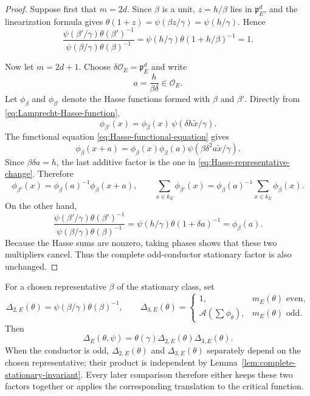 \documentclass[11pt]{amsart}
\theoremstyle{definition}
\theoremstyle{remark}
\newcommand{\cO}{\mathcal O}
\newcommand{\p}{\mathfrak p}
\newcommand{\Aphase}{\mathcal A}
\begin{document}
\begin{proof}
Suppose first that $m=2d$.  Since $\beta$ is a unit,
$z=h/\beta$ lies in $\p_E^d$, and the linearization formula gives
$\theta(1+z)=\psi(\beta z/\gamma)=\psi(h/\gamma)$.  Hence
\[
 \frac{\psi(\beta'/\gamma)\theta(\beta')^{-1}}
      {\psi(\beta/\gamma)\theta(\beta)^{-1}}
 =\psi(h/\gamma)\theta(1+h/\beta)^{-1}=1.
\]

Now let $m=2d+1$.  Choose $\delta\cO_E=\p_E^d$ and write
\[
 a=\frac{h}{\beta\delta}\in\cO_E.
\]
Let $\phi_\beta$ and $\phi_{\beta'}$ denote the Hasse functions formed
with $\beta$ and $\beta'$.  Directly from
\eqref{eq:Lamprecht-Hasse-function},
\begin{equation}\label{eq:Hasse-representative-change}
 \phi_{\beta'}(x)
 =\phi_\beta(x)\,\psi(\delta h\widetilde x/\gamma).
\end{equation}
The functional equation \eqref{eq:Hasse-functional-equation} gives
\[
 \phi_\beta(x+a)
 =\phi_\beta(x)\phi_\beta(a)
   \psi(\beta\delta^2a\widetilde x/\gamma).
\]
Since $\beta\delta a=h$, the last additive factor is the one in
\eqref{eq:Hasse-representative-change}.  Therefore
\[
 \phi_{\beta'}(x)=\phi_\beta(a)^{-1}\phi_\beta(x+a),
 \qquad
 \sum_{x\in k_E}\phi_{\beta'}(x)
 =\phi_\beta(a)^{-1}\sum_{x\in k_E}\phi_\beta(x).
\]
On the other hand,
\[
 \frac{\psi(\beta'/\gamma)\theta(\beta')^{-1}}
      {\psi(\beta/\gamma)\theta(\beta)^{-1}}
 =\psi(h/\gamma)\theta(1+\delta a)^{-1}
 =\phi_\beta(a).
\]
Because the Hasse sums are nonzero, taking phases shows that these two
multipliers cancel.  Thus the complete odd-conductor stationary factor
is also unchanged.
\end{proof}

For a chosen representative $\beta$ of the stationary class, set
\[
 \Delta_{2,E}(\theta)=
 \psi(\beta/\gamma)\theta(\beta)^{-1},
 \qquad
 \Delta_{3,E}(\theta)=
 \begin{cases}
 1,&m_E(\theta)\text{ even},\\
 \Aphase(\sum\phi_\theta),&m_E(\theta)\text{ odd}.
 \end{cases}
\]
Then
\begin{equation}\label{eq:Delta-factorization-new}
 \Delta_E(\theta,\psi)=\theta(\gamma)\Delta_{2,E}(\theta)
                                      \Delta_{3,E}(\theta).
\end{equation}
When the conductor is odd, $\Delta_{2,E}(\theta)$ and
$\Delta_{3,E}(\theta)$ separately depend on the chosen representative;
their product is independent by
Lemma~\ref{lem:complete-stationary-invariant}.  Every later comparison
therefore either keeps these two factors together or applies the
corresponding translation to the critical function.
\end{document}
